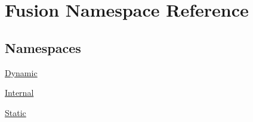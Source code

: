 \hypertarget{namespace_fusion}{\section{Fusion Namespace Reference}
\label{namespace_fusion}
}
\subsection*{Namespaces}
\begin{DoxyCompactItemize}
\item 
\hyperlink{namespace_fusion_1_1_dynamic}{Dynamic}
\item 
\hyperlink{namespace_fusion_1_1_internal}{Internal}
\item 
\hyperlink{namespace_fusion_1_1_static}{Static}
\end{DoxyCompactItemize}
